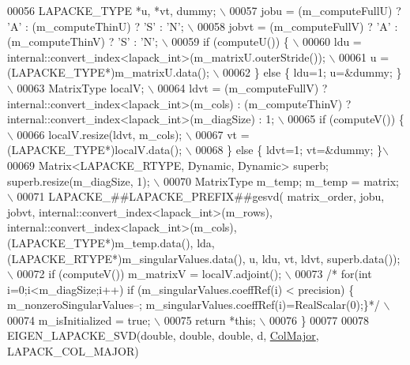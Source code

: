 \begin{DoxyCode}
00056 \textcolor{preprocessor}{  LAPACKE\_TYPE *u, *vt, dummy; \(\backslash\)}
00057 \textcolor{preprocessor}{  jobu  = (m\_computeFullU) ? 'A' : (m\_computeThinU) ? 'S' : 'N'; \(\backslash\)}
00058 \textcolor{preprocessor}{  jobvt = (m\_computeFullV) ? 'A' : (m\_computeThinV) ? 'S' : 'N'; \(\backslash\)}
00059 \textcolor{preprocessor}{  if (computeU()) \{ \(\backslash\)}
00060 \textcolor{preprocessor}{    ldu  = internal::convert\_index<lapack\_int>(m\_matrixU.outerStride()); \(\backslash\)}
00061 \textcolor{preprocessor}{    u    = (LAPACKE\_TYPE*)m\_matrixU.data(); \(\backslash\)}
00062 \textcolor{preprocessor}{  \} else \{ ldu=1; u=&dummy; \}\(\backslash\)}
00063 \textcolor{preprocessor}{  MatrixType localV; \(\backslash\)}
00064 \textcolor{preprocessor}{  ldvt = (m\_computeFullV) ? internal::convert\_index<lapack\_int>(m\_cols) : (m\_computeThinV) ?
       internal::convert\_index<lapack\_int>(m\_diagSize) : 1; \(\backslash\)}
00065 \textcolor{preprocessor}{  if (computeV()) \{ \(\backslash\)}
00066 \textcolor{preprocessor}{    localV.resize(ldvt, m\_cols); \(\backslash\)}
00067 \textcolor{preprocessor}{    vt   = (LAPACKE\_TYPE*)localV.data(); \(\backslash\)}
00068 \textcolor{preprocessor}{  \} else \{ ldvt=1; vt=&dummy; \}\(\backslash\)}
00069 \textcolor{preprocessor}{  Matrix<LAPACKE\_RTYPE, Dynamic, Dynamic> superb; superb.resize(m\_diagSize, 1); \(\backslash\)}
00070 \textcolor{preprocessor}{  MatrixType m\_temp; m\_temp = matrix; \(\backslash\)}
00071 \textcolor{preprocessor}{  LAPACKE\_##LAPACKE\_PREFIX##gesvd( matrix\_order, jobu, jobvt, internal::convert\_index<lapack\_int>(m\_rows),
       internal::convert\_index<lapack\_int>(m\_cols), (LAPACKE\_TYPE*)m\_temp.data(), lda,
       (LAPACKE\_RTYPE*)m\_singularValues.data(), u, ldu, vt, ldvt, superb.data()); \(\backslash\)}
00072 \textcolor{preprocessor}{  if (computeV()) m\_matrixV = localV.adjoint(); \(\backslash\)}
00073 \textcolor{preprocessor}{ }\textcolor{comment}{/* for(int i=0;i<m\_diagSize;i++) if (m\_singularValues.coeffRef(i) < precision) \{
       m\_nonzeroSingularValues--; m\_singularValues.coeffRef(i)=RealScalar(0);\}*/}\textcolor{preprocessor}{ \(\backslash\)}
00074 \textcolor{preprocessor}{  m\_isInitialized = true; \(\backslash\)}
00075 \textcolor{preprocessor}{  return *this; \(\backslash\)}
00076 \textcolor{preprocessor}{\}}
00077 
00078 EIGEN\_LAPACKE\_SVD(\textcolor{keywordtype}{double},   \textcolor{keywordtype}{double},                \textcolor{keywordtype}{double}, d, \hyperlink{group__enums_ggaacded1a18ae58b0f554751f6cdf9eb13a0cbd4bdd0abcfc0224c5fcb5e4f6669a}{ColMajor}, LAPACK\_COL\_MAJOR)

\end{DoxyCode}
